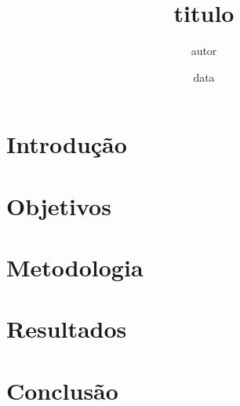 \documentclass[12pt, a4paper, twocolumn]{article}
{general}
\title{{titulo}}
\author{{autor}}
\date{{data}}
\begin{document}
\maketitle
\tableofcontents
\newpage

\section{Introdução}


\section{{Objetivos}}


\section{Metodologia}


\section{Resultados}


\section{Conclusão}




\end{document}
